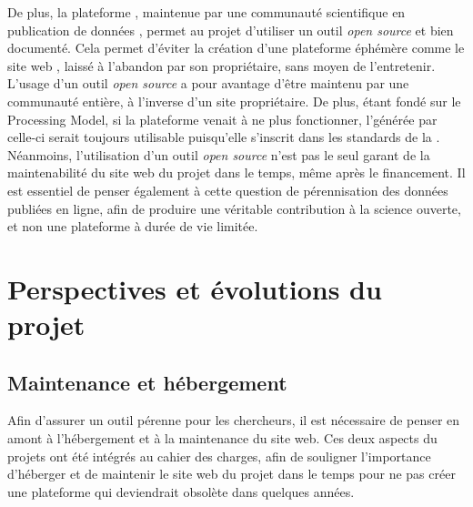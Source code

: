 De plus, la plateforme \tp, maintenue par une communauté scientifique en publication de données \TEI, permet au projet \COREL d'utiliser un outil \textit{open source} et bien documenté. Cela permet d'éviter la création d'une plateforme éphémère comme le site web \LSC, laissé à l'abandon par son propriétaire, sans moyen de l'entretenir. L'usage d'un outil \textit{open source} a pour avantage d'être maintenu par une communauté entière, à l'inverse d'un site propriétaire. De plus, \tp étant fondé sur le \TEI Processing Model, si la plateforme venait à ne plus fonctionner, l'\ODD générée par celle-ci serait toujours utilisable puisqu'elle s'inscrit dans les standards de la \TEI. Néanmoins, l'utilisation d'un outil \textit{open source} n'est pas le seul garant de la maintenabilité du site web du projet dans le temps, même après le financement. Il est essentiel de penser également à cette question de pérennisation des données publiées en ligne, afin de produire une véritable contribution à la science ouverte, et non une plateforme à durée de vie limitée. 

 \section{Perspectives et évolutions du projet }
    \subsection{Maintenance et hébergement}
Afin d'assurer un outil pérenne pour les chercheurs, il est nécessaire de penser en amont à l'hébergement et à la maintenance du site web. Ces deux aspects du projets ont été intégrés au cahier des charges, afin de souligner l'importance d'héberger et de maintenir le site web du projet dans le temps pour ne pas créer une plateforme qui deviendrait obsolète dans quelques années. 

